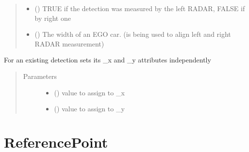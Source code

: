 \documentclass[letterpaper,10pt,english]{Reference manual}
\begin{document}
\begin{fulllineitems}
\begin{quote}
\begin{description}
\begin{itemize}
\item {} 
 () \textendash{} TRUE if the detection was measured by the left RADAR, FALSE if by right one

\item {} 
 () \textendash{} The width of an EGO car. (is being used to align left and right RADAR measurement)

\end{itemize}

\end{description}\end{quote}

\begin{fulllineitems}
\label{\detokenize{datacontainers:data_containers.DetectionPoint.set_XY}}
For an existing detection sets its \_x and \_y attributes independently
\begin{quote}\begin{description}
\item[{Parameters}] \leavevmode\begin{itemize}
\item {} 
 () \textendash{} value to assign to \_x

\item {} 
 () \textendash{} value to assign to \_y

\end{itemize}

\end{description}\end{quote}

\end{fulllineitems}


\end{fulllineitems}



\section{ReferencePoint}
\label{\detokenize{datacontainers:referencepoint}}
\end{document}
